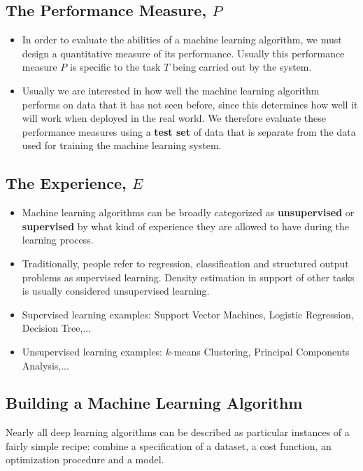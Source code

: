 \subsection{The Performance Measure, $P$}
\begin{itemize}
    \item In order to evaluate the abilities of a machine learning algorithm, we must design a quantitative measure of its performance. Usually this performance measure $P$ is specific to the task $T$ being carried out by the system.
    
    \item 	Usually we are interested in how well the machine learning algorithm performs	on data that it has not seen before, since this determines how well it will work when deployed in the real world. We therefore evaluate these performance measures using a \textbf{test set} of data that is separate from the data used for training the machine	learning system.
\end{itemize}
\subsection{The Experience, $E$}
        \begin{itemize}
        \item Machine learning algorithms can be broadly categorized as \textbf{unsupervised} or \textbf{supervised}	by what kind of experience they are allowed to have during the learning process. 
        
        \item Traditionally, people refer to regression, classification and structured output problems as supervised learning. Density estimation in
        support of other tasks is usually considered unsupervised learning.
        
        \item Supervised learning examples: Support Vector Machines, Logistic Regression, Decision Tree,...
        \item Unsupervised learning examples: $k$-means Clustering, Principal Components Analysis,...
    \end{itemize}
\subsection{Building a Machine Learning Algorithm}
	
Nearly all deep learning algorithms can be described as particular instances of a fairly simple recipe: combine a specification of a dataset, a cost function, an optimization procedure and a model.

